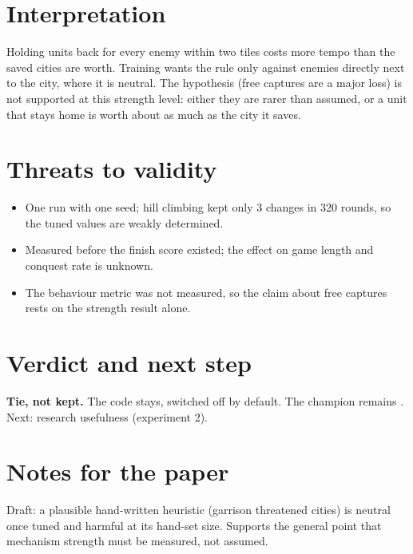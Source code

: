 \documentclass{../polyexp}
\begin{document}
\section{Interpretation}
Holding units back for every enemy within two tiles costs more tempo than the saved cities are worth. Training wants the rule only against enemies directly next to the city, where it is neutral. The hypothesis (free captures are a major loss) is not supported at this strength level: either they are rarer than assumed, or a unit that stays home is worth about as much as the city it saves.


\section{Threats to validity}
\begin{itemize}
\item One run with one seed; hill climbing kept only 3 changes in 320 rounds, so the tuned values are weakly determined.
\item Measured before the finish score existed; the effect on game length and conquest rate is unknown.
\item The behaviour metric was not measured, so the claim about free captures rests on the strength result alone.
\end{itemize}

\section{Verdict and next step}
\textbf{Tie, not kept.} The code stays, switched off by default. The champion remains . Next: research usefulness (experiment 2).

\section{Notes for the paper}
Draft: a plausible hand-written heuristic (garrison threatened cities) is neutral once tuned and harmful at its hand-set size. Supports the general point that mechanism strength must be measured, not assumed.

\end{document}
